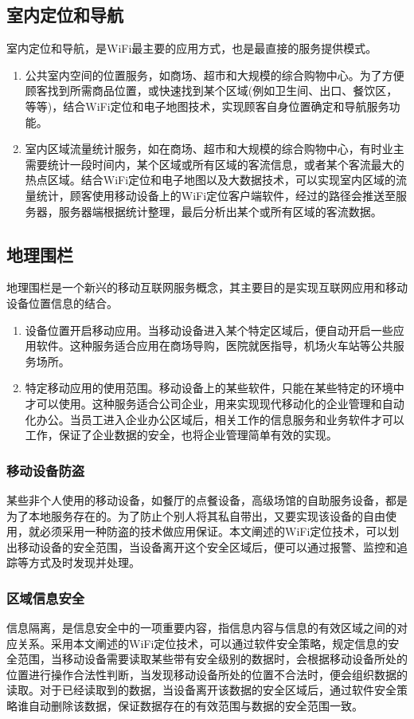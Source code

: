 \documentclass[UTF8, twocolumn ]{ctexart}
\begin{document}
\subsection{室内定位和导航}
室内定位和导航，是WiFi最主要的应用方式，也是最直接的服务提供模式。
\begin{enumerate}
\item 公共室内空间的位置服务，如商场、超市和大规模的综合购物中心。为了方便顾客找到所需商品位置，或快速找到某个区域(例如卫生间、出口、餐饮区，等等)，结合WiFi定位和电子地图技术，实现顾客自身位置确定和导航服务功能。
\item 室内区域流量统计服务，如在商场、超市和大规模的综合购物中心，有时业主需要统计一段时间内，某个区域或所有区域的客流信息，或者某个客流最大的热点区域。结合WiFi定位和电子地图以及大数据技术，可以实现室内区域的流量统计，顾客使用移动设备上的WiFi定位客户端软件，经过的路径会推送至服务器，服务器端根据统计整理，最后分析出某个或所有区域的客流数据。
\end{enumerate}
\subsection{地理围栏}
地理围栏是一个新兴的移动互联网服务概念，其主要目的是实现互联网应用和移动设备位置信息的结合。
\begin{enumerate}
\item 设备位置开启移动应用。当移动设备进入某个特定区域后，便自动开启一些应用软件。这种服务适合应用在商场导购，医院就医指导，机场火车站等公共服务场所。
\item 特定移动应用的使用范围。移动设备上的某些软件，只能在某些特定的环境中才可以使用。这种服务适合公司企业，用来实现现代移动化的企业管理和自动化办公。当员工进入企业办公区域后，相关工作的信息服务和业务软件才可以工作，保证了企业数据的安全，也将企业管理简单有效的实现。
\end{enumerate}
\subsubsection{移动设备防盗}
某些非个人使用的移动设备，如餐厅的点餐设备，高级场馆的自助服务设备，都是为了本地服务存在的。为了防止个别人将其私自带出，又要实现该设备的自由使用，就必须采用一种防盗的技术做应用保证。本文阐述的WiFi定位技术，可以划出移动设备的安全范围，当设备离开这个安全区域后，便可以通过报警、监控和追踪等方式及时发现并处理。
\subsubsection{区域信息安全}
信息隔离，是信息安全中的一项重要内容，指信息内容与信息的有效区域之间的对应关系。采用本文阐述的WiFi定位技术，可以通过软件安全策略，规定信息的安全范围，当移动设备需要读取某些带有安全级别的数据时，会根据移动设备所处的位置进行操作合法性判断，当发现移动设备所处的位置不合法时，便会组织数据的读取。对于已经读取到的数据，当设备离开该数据的安全区域后，通过软件安全策略谁自动删除该数据，保证数据存在的有效范围与数据的安全范围一致。
\end{document}
